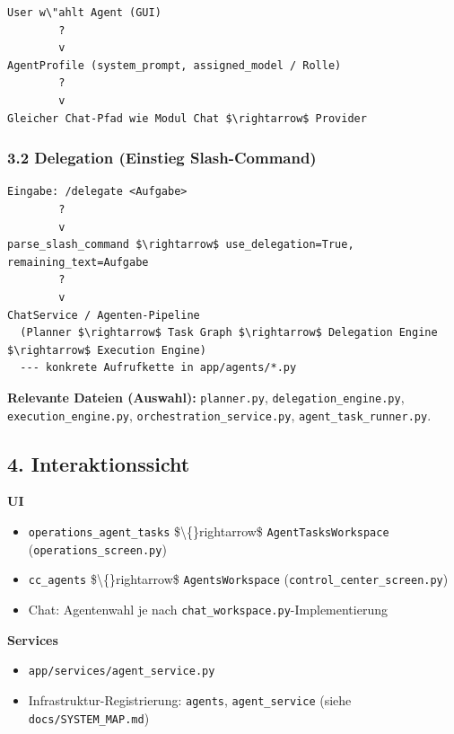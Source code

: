 \begin{verbatim}
User w\"ahlt Agent (GUI)
        ?
        v
AgentProfile (system_prompt, assigned_model / Rolle)
        ?
        v
Gleicher Chat-Pfad wie Modul Chat $\rightarrow$ Provider
\end{verbatim}

\subsubsection{3.2 Delegation (Einstieg Slash-Command)}

\begin{verbatim}
Eingabe: /delegate <Aufgabe>
        ?
        v
parse_slash_command $\rightarrow$ use_delegation=True, remaining_text=Aufgabe
        ?
        v
ChatService / Agenten-Pipeline
  (Planner $\rightarrow$ Task Graph $\rightarrow$ Delegation Engine $\rightarrow$ Execution Engine)
  --- konkrete Aufrufkette in app/agents/*.py
\end{verbatim}

\textbf{Relevante Dateien (Auswahl):} \texttt{planner.py}, \texttt{delegation\_engine.py}, \texttt{execution\_engine.py}, \texttt{orchestration\_service.py}, \texttt{agent\_task\_runner.py}.

\subsection{4. Interaktionssicht}

\textbf{UI}

\begin{itemize}
\item \texttt{operations\_agent\_tasks} \$\textbackslash\{\}rightarrow\$ \texttt{AgentTasksWorkspace} (\texttt{operations\_screen.py})
\item \texttt{cc\_agents} \$\textbackslash\{\}rightarrow\$ \texttt{AgentsWorkspace} (\texttt{control\_center\_screen.py})
\item Chat: Agentenwahl je nach \texttt{chat\_workspace.py}-Implementierung
\end{itemize}

\textbf{Services}

\begin{itemize}
\item \texttt{app/services/agent\_service.py}
\item Infrastruktur-Registrierung: \texttt{agents}, \texttt{agent\_service} (siehe \texttt{docs/SYSTEM\_MAP.md})
\end{itemize}

